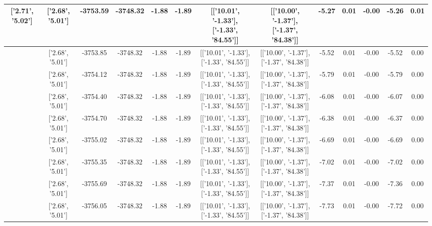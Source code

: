 \begin{table}[htbp]
\begin{adjustbox}{angle=90}
\begin{tabular}{|c|c|c|c|c|c|c|c|c|c|c|c|c|}
 ['2.71', '5.02'] & ['2.68', '5.01'] & -3753.59 & -3748.32 & -1.88 & -1.89 & [['10.01', '-1.33'], ['-1.33', '84.55']] & [['10.00', '-1.37'], ['-1.37', '84.38']] & -5.27 & 0.01 & -0.00 & -5.26 & 0.01\\ \hline
 ['2.71', '5.02'] & ['2.68', '5.01'] & -3753.85 & -3748.32 & -1.88 & -1.89 & [['10.01', '-1.33'], ['-1.33', '84.55']] & [['10.00', '-1.37'], ['-1.37', '84.38']] & -5.52 & 0.01 & -0.00 & -5.52 & 0.00\\ \hline
 ['2.71', '5.02'] & ['2.68', '5.01'] & -3754.12 & -3748.32 & -1.88 & -1.89 & [['10.01', '-1.33'], ['-1.33', '84.55']] & [['10.00', '-1.37'], ['-1.37', '84.38']] & -5.79 & 0.01 & -0.00 & -5.79 & 0.00\\ \hline
 ['2.71', '5.02'] & ['2.68', '5.01'] & -3754.40 & -3748.32 & -1.88 & -1.89 & [['10.01', '-1.33'], ['-1.33', '84.55']] & [['10.00', '-1.37'], ['-1.37', '84.38']] & -6.08 & 0.01 & -0.00 & -6.07 & 0.00\\ \hline
 ['2.71', '5.02'] & ['2.68', '5.01'] & -3754.70 & -3748.32 & -1.88 & -1.89 & [['10.01', '-1.33'], ['-1.33', '84.55']] & [['10.00', '-1.37'], ['-1.37', '84.38']] & -6.38 & 0.01 & -0.00 & -6.37 & 0.00\\ \hline
 ['2.71', '5.02'] & ['2.68', '5.01'] & -3755.02 & -3748.32 & -1.88 & -1.89 & [['10.01', '-1.33'], ['-1.33', '84.55']] & [['10.00', '-1.37'], ['-1.37', '84.38']] & -6.69 & 0.01 & -0.00 & -6.69 & 0.00\\ \hline
 ['2.71', '5.02'] & ['2.68', '5.01'] & -3755.35 & -3748.32 & -1.88 & -1.89 & [['10.01', '-1.33'], ['-1.33', '84.55']] & [['10.00', '-1.37'], ['-1.37', '84.38']] & -7.02 & 0.01 & -0.00 & -7.02 & 0.00\\ \hline
 ['2.71', '5.02'] & ['2.68', '5.01'] & -3755.69 & -3748.32 & -1.88 & -1.89 & [['10.01', '-1.33'], ['-1.33', '84.55']] & [['10.00', '-1.37'], ['-1.37', '84.38']] & -7.37 & 0.01 & -0.00 & -7.36 & 0.00\\ \hline
 ['2.72', '5.02'] & ['2.68', '5.01'] & -3756.05 & -3748.32 & -1.88 & -1.89 & [['10.01', '-1.33'], ['-1.33', '84.55']] & [['10.00', '-1.37'], ['-1.37', '84.38']] & -7.73 & 0.01 & -0.00 & -7.72 & 0.00\\ \hline
            \end{tabular}
        \end{adjustbox}
        \caption{}
        \label{}
    \end{table}
    